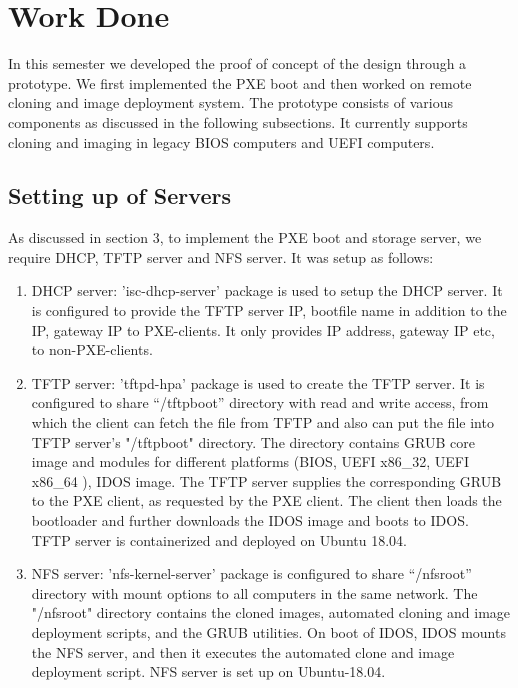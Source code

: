 \documentclass[a4paper,12pt]{article}
\begin{document}


\newpage
\section{\fontsize{16pt}{1em} Work Done}
In this semester we developed the proof of concept of the design through a prototype. We first implemented the PXE boot and then worked on remote cloning and image deployment system. The prototype consists of various components as discussed in the following subsections. It currently supports cloning and imaging in legacy BIOS computers and UEFI computers. 
\subsection{ Setting up of Servers}
As discussed in section 3, to implement the PXE boot and storage server, we require DHCP, TFTP server and NFS server. It was setup as follows:
\begin{enumerate}[label=\roman*.]
    \item DHCP server: 'isc-dhcp-server' package is used to setup the DHCP server. It is configured to provide the TFTP server IP, bootfile name in addition to the IP, gateway IP to PXE-clients. It only provides IP address, gateway IP etc, to non-PXE-clients.
    \item TFTP server: 'tftpd-hpa' package is used to create the TFTP server. It is configured to share  “/tftpboot” directory with read and write access, from which the client can fetch the file from TFTP and also can put the file into TFTP server's "/tftpboot" directory. The directory contains  GRUB core image and modules for different platforms (BIOS,  UEFI x86\_32, UEFI x86\_64 ), IDOS image. The TFTP server supplies the corresponding GRUB to the PXE client, as requested by the PXE client. The client then loads the bootloader and further downloads the IDOS image and boots to IDOS. TFTP server is containerized and deployed on Ubuntu 18.04.
    \item  NFS server: 'nfs-kernel-server' package is configured to share “/nfsroot” directory with mount options to all computers in the same network. The "/nfsroot" directory contains the cloned images, automated cloning and image deployment scripts, and the GRUB utilities. On boot of IDOS, IDOS mounts the NFS server, and then it executes the automated clone and image deployment script. NFS server is set up on Ubuntu-18.04. 
\end{enumerate}
\end{document}

